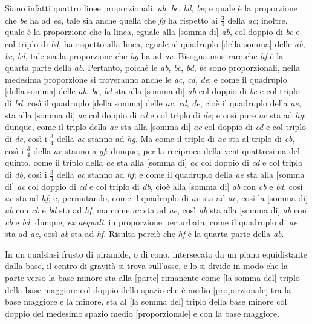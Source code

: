 \documentclass[11pt,twoside,openany]{book}
\begin{document}
Siano infatti quattro linee proporzionali, \emph{ab}, \emph{bc}, \emph{bd}, \emph{be}; e quale è la proporzione che \emph{be} ha ad \emph{ea}, tale sia anche quella che \emph{fg} ha rispetto ai $\frac{3}{4}$ della \emph{ac}; inoltre, quale è la proporzione che la linea, eguale alla [somma di] \emph{ab}, col doppio di \emph{bc} e col triplo di \emph{bd}, ha rispetto alla linea, eguale al quadruplo [della somma] delle \emph{ab}, \emph{bc}, \emph{bd}, tale sia la proporzione che \emph{hg} ha ad \emph{ac}. Bisogna mostrare che \emph{hf} è la quarta parte della \emph{ab}. Pertanto, poiché le \emph{ab}, \emph{bc}, \emph{bd}, \emph{be} sono proporzionali, nella medesima proporzione si troveranno anche le \emph{ac}, \emph{cd}, \emph{de}; e come il quadruplo [della somma] delle \emph{ab}, \emph{bc}, \emph{bd} sta alla [somma di] \emph{ab} col doppio di \emph{bc} e col triplo di \emph{bd}, così il quadruplo [della somma] delle \emph{ac}, \emph{cd}, \emph{de}, cioè il quadruplo della \emph{ae}, sta alla [somma di] \emph{ac} col doppio di \emph{cd} e col triplo di \emph{de}; e così pure \emph{ac} sta ad \emph{hg}: dunque, come il triplo della \emph{ae} sta alla [somma di] \emph{ac} col doppio di \emph{cd} e col triplo di \emph{de}, così i $\frac{3}{4}$ della \emph{ac} stanno ad \emph{hg}. Ma come il triplo di \emph{ae} sta al triplo di \emph{eb}, così i $\frac{3}{4}$ della \emph{ac} stanno a \emph{gf}: dunque, per la reciproca della ventiquattresima del quinto, come il triplo della \emph{ae} sta alla [somma di] \emph{ac} col doppio di \emph{cd} e col triplo di \emph{db}, così i $\frac{3}{4}$ della \emph{ac} stanno ad \emph{hf}; e come il quadruplo della \emph{ae} sta alla [somma di] \emph{ac} col doppio di \emph{cd} e col triplo di \emph{db}, cioè alla [somma di] \emph{ab} con \emph{cb} e \emph{bd}, così \emph{ac} sta ad \emph{hf}; e, permutando, come il quadruplo di \emph{ae} sta ad \emph{ac}, così la [somma di] \emph{ab} con \emph{cb} e \emph{bd} sta ad \emph{hf}; ma come \emph{ac} sta ad \emph{ae}, così \emph{ab} sta alla [somma di] \emph{ab} con \emph{cb} e \emph{bd}: dunque, \emph{ex aequali}, in proporzione perturbata, come il quadruplo di \emph{ae} sta ad \emph{ae}, così \emph{ab} sta ad \emph{hf}. Risulta perciò che \emph{hf} è la quarta parte della \emph{ab}.

In un qualsiasi frusto di piramide, o di cono, intersecato da un piano equidistante dalla base, il centro di gravità si trova sull'asse, e lo si divide in modo che la parte verso la base minore sta alla [parte] rimanente come [la somma del] triplo della base maggiore col doppio dello spazio che è medio [proporzionale] tra la base maggiore e la minore, sta al [la somma del] triplo della base minore col doppio del medesimo spazio medio [proporzionale] e con la base maggiore.
\end{document}
